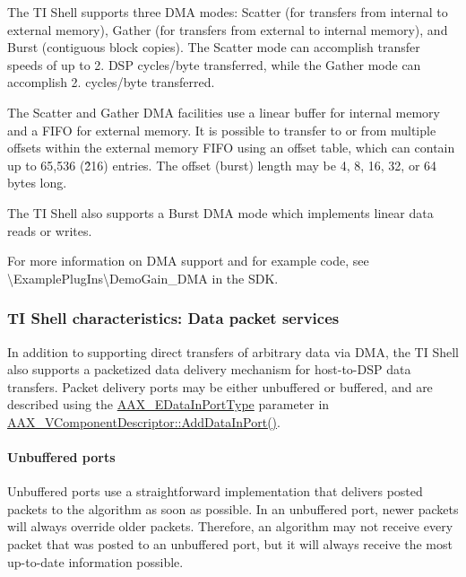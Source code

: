 The T\+I Shell supports three D\+M\+A modes\+: Scatter (for transfers from internal to external memory), Gather (for transfers from external to internal memory), and Burst (contiguous block copies). The Scatter mode can accomplish transfer speeds of up to 2. D\+S\+P cycles/byte transferred, while the Gather mode can accomplish 2. cycles/byte transferred.

The Scatter and Gather D\+M\+A facilities use a linear buffer for internal memory and a F\+I\+F\+O for external memory. It is possible to transfer to or from multiple offsets within the external memory F\+I\+F\+O using an offset table, which can contain up to 65,536 (2̂16) entries. The offset (burst) length may be 4, 8, 16, 32, or 64 bytes long.

The T\+I Shell also supports a Burst D\+M\+A mode which implements linear data reads or writes.

For more information on D\+M\+A support and for example code, see {\ttfamily \textbackslash{}Example\+Plug\+Ins\textbackslash{}Demo\+Gain\+\_\+\+D\+M\+A} in the S\+D\+K.

\hypertarget{a00362_subsection__ti_shell_characteristics_data_packet_services}{}\subsubsection{T\+I Shell characteristics\+: Data packet services}\label{a00362_subsection__ti_shell_characteristics_data_packet_services}
 In addition to supporting direct transfers of arbitrary data via D\+M\+A, the T\+I Shell also supports a packetized data delivery mechanism for host-\/to-\/\+D\+S\+P data transfers. Packet delivery ports may be either unbuffered or buffered, and are described using the \hyperlink{a00206_ab5677b173ad8647c24d34d28272d11fc}{A\+A\+X\+\_\+\+E\+Data\+In\+Port\+Type} parameter in \hyperlink{a00131_a76ab9a0bef4cd6b6aa7144ed1adbe8a3}{A\+A\+X\+\_\+\+V\+Component\+Descriptor\+::\+Add\+Data\+In\+Port()}.

\hypertarget{a00362_subsubsection__unbuffered_ports_}{}\paragraph{Unbuffered ports}\label{a00362_subsubsection__unbuffered_ports_}
 Unbuffered ports use a straightforward implementation that delivers posted packets to the algorithm as soon as possible. In an unbuffered port, newer packets will always override older packets. Therefore, an algorithm may not receive every packet that was posted to an unbuffered port, but it will always receive the most up-\/to-\/date information possible.

